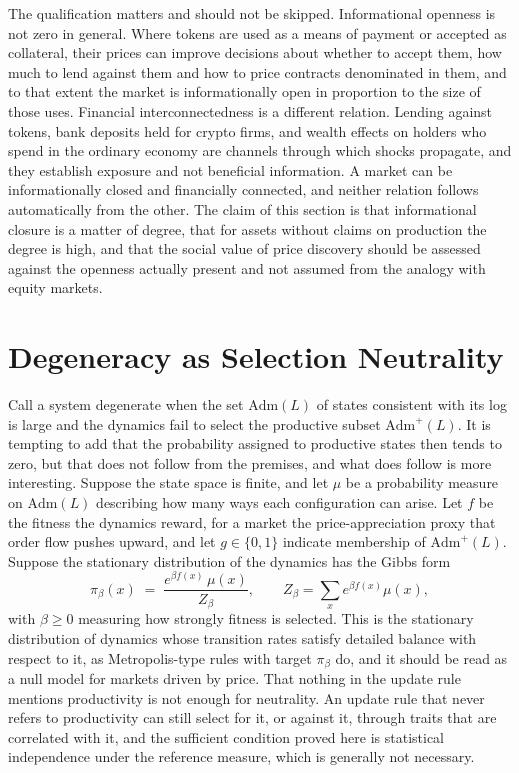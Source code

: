 \documentclass[11pt]{article}
\theoremstyle{remark}
\newcommand{\Adm}{\mathrm{Adm}}
\begin{document}
The qualification matters and should not be skipped. Informational openness is not zero in general. Where tokens are used as a means of payment or accepted as collateral, their prices can improve decisions about whether to accept them, how much to lend against them and how to price contracts denominated in them, and to that extent the market is informationally open in proportion to the size of those uses. Financial interconnectedness is a different relation. Lending against tokens, bank deposits held for crypto firms, and wealth effects on holders who spend in the ordinary economy are channels through which shocks propagate, and they establish exposure and not beneficial information. A market can be informationally closed and financially connected, and neither relation follows automatically from the other. The claim of this section is that informational closure is a matter of degree, that for assets without claims on production the degree is high, and that the social value of price discovery should be assessed against the openness actually present and not assumed from the analogy with equity markets.

\section{Degeneracy as Selection Neutrality}\label{sec:selection}

Call a system degenerate when the set $\Adm(L)$ of states consistent with its log is large and the dynamics fail to select the productive subset $\Adm^{+}(L)$. It is tempting to add that the probability assigned to productive states then tends to zero, but that does not follow from the premises, and what does follow is more interesting. Suppose the state space is finite, and let $\mu$ be a probability measure on $\Adm(L)$ describing how many ways each configuration can arise. Let $f$ be the fitness the dynamics reward, for a market the price-appreciation proxy that order flow pushes upward, and let $g\in\{0,1\}$ indicate membership of $\Adm^{+}(L)$. Suppose the stationary distribution of the dynamics has the Gibbs form
\[
\pi_\beta(x)\;=\;\frac{e^{\beta f(x)}\,\mu(x)}{Z_\beta},\qquad Z_\beta=\sum_x e^{\beta f(x)}\mu(x),
\]
with $\beta\ge 0$ measuring how strongly fitness is selected. This is the stationary distribution of dynamics whose transition rates satisfy detailed balance with respect to it, as Metropolis-type rules with target $\pi_\beta$ do, and it should be read as a null model for markets driven by price. That nothing in the update rule mentions productivity is not enough for neutrality. An update rule that never refers to productivity can still select for it, or against it, through traits that are correlated with it, and the sufficient condition proved here is statistical independence under the reference measure, which is generally not necessary.
\end{document}
